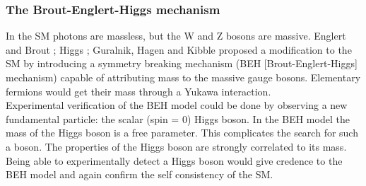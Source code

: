 \documentclass[a4paper,12pt]{article}
\begin{document}
\subsubsection{The Brout-Englert-Higgs mechanism}
In the SM photons are massless, but the W and Z bosons are massive. Englert and Brout \cite{paper1}; Higgs \cite{paper2}; Guralnik, Hagen and Kibble \cite{paper3} proposed a modification to the SM by introducing a symmetry breaking mechanism (BEH [Brout-Englert-Higgs] mechanism) capable of attributing mass to the massive gauge bosons. Elementary fermions would get their mass through a Yukawa interaction. 
\\Experimental verification of the BEH model could be done by observing a new fundamental particle: the scalar (spin = 0) Higgs boson. In the BEH model the mass of the Higgs boson is a free parameter. This complicates the search for such a boson. The properties of the Higgs boson are strongly correlated to its mass. Being able to experimentally detect a Higgs boson would give credence to the BEH model and again confirm the self consistency of the SM.
\end{document}
